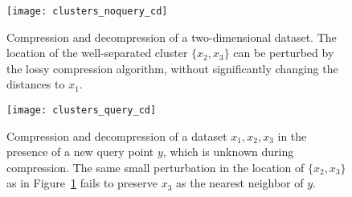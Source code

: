 \begin{figure}[t]
\vskip 0.2in
\begin{center}
\centerline{\texttt{[image: clusters\_noquery\_cd]}}
\caption{Compression and decompression of a two-dimensional dataset. The location of the well-separated cluster $\{x_2,x_3\}$ can be perturbed by the lossy compression algorithm, without significantly changing the distances to $x_1$.}
\label{fig:noquery}
\end{center}
\vskip -0.2in
\end{figure} 

\begin{figure}
\vskip 0.2in
\begin{center}
\centerline{\texttt{[image: clusters\_query\_cd]}}
\caption{Compression and decompression of a dataset $x_1,x_2,x_3$ in the presence of a new query point $y$, which is unknown during compression. The same small perturbation in the location of $\{x_2,x_3\}$ as in Figure~\ref{fig:noquery} fails to preserve $x_3$ as the nearest neighbor of $y$.}
\label{fig:query}
\end{center}
\vskip -0.2in
\end{figure} 
